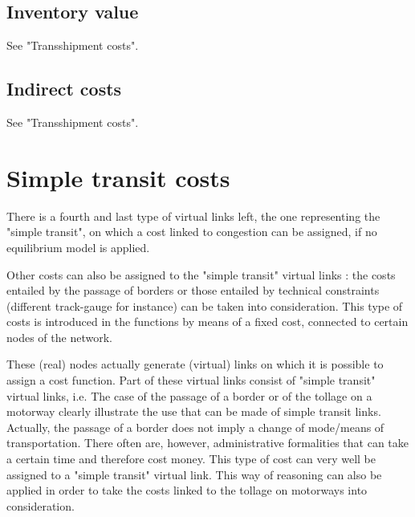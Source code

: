 \subsection{Inventory value}

See "Transshipment costs".



\subsection{Indirect costs}

See "Transshipment costs".



\section{Simple transit costs}

There is a  fourth and last type of virtual links left, the one representing the
"simple transit", on which a cost linked to congestion can be assigned, if no
equilibrium model is applied.

Other costs can also be assigned to the "simple transit" virtual links :
the costs entailed by the passage of borders or those entailed
by technical constraints (different track-gauge for instance) can be
taken into consideration.  This type of costs is introduced in the functions by
means of a fixed cost, connected to certain nodes of the network.

These (real) nodes actually generate (virtual) links on which it is possible to
assign a cost function.  Part of these virtual links consist of "simple transit" virtual links, i.e.
The case of the passage of a border or of the
tollage on a motorway clearly illustrate the use that can be made of simple
transit links.  Actually, the passage of a border does not imply a change of
mode/means of transportation.  There often are, however, administrative
formalities that can take a certain time and therefore cost money.  This type of
cost can very well be assigned to a "simple transit" virtual link.
This way of reasoning can also be applied in order to take the costs linked to
the tollage on motorways into consideration.
